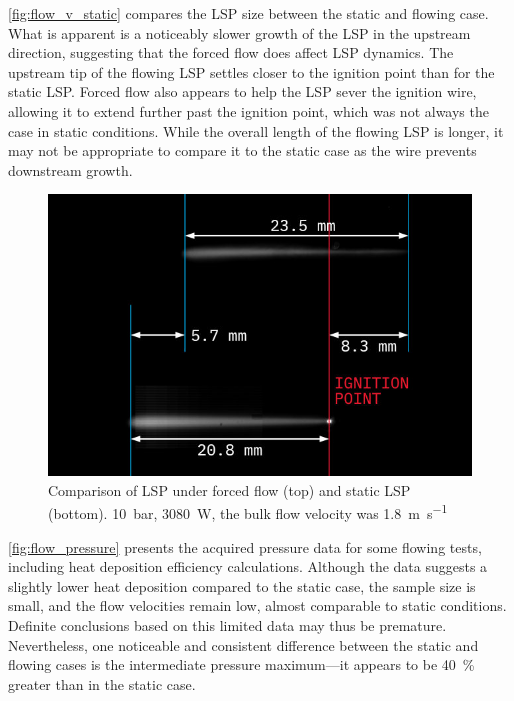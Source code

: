         \autoref{fig:flow_v_static} compares the LSP size between the static and flowing case. What is apparent is a noticeably slower growth of the LSP in the upstream direction, suggesting that the forced flow does affect LSP dynamics. The upstream tip of the flowing LSP settles closer to the ignition point than for the static LSP. Forced flow also appears to help the LSP sever the ignition wire, allowing it to extend further past the ignition point, which was not always the case in static conditions. While the overall length of the flowing LSP is longer, it may not be appropriate to compare it to the static case as the wire prevents downstream growth.

        \begin{figure}[h]
            \centering
            \includegraphics[]{assets/5 results/flow_static_lsp.jpg}
            \caption[Comparison of LSP under forced flow (top) and static LSP (bottom)]{Comparison of LSP under forced flow (top) and static LSP (bottom). \qty{10}{bar}, \qty{3080}{W}, the bulk flow velocity was \qty{1.8}{m.s^{-1}}}
            \label{fig:flow_v_static}
        \end{figure}

        \autoref{fig:flow_pressure} presents the acquired pressure data for some flowing tests, including heat deposition efficiency calculations. Although the data suggests a slightly lower heat deposition compared to the static case, the sample size is small, and the flow velocities remain low, almost comparable to static conditions. Definite conclusions based on this limited data may thus be premature. Nevertheless, one noticeable and consistent difference between the static and flowing cases is the intermediate pressure maximum---it appears to be 40~\% greater than in the static case. 

